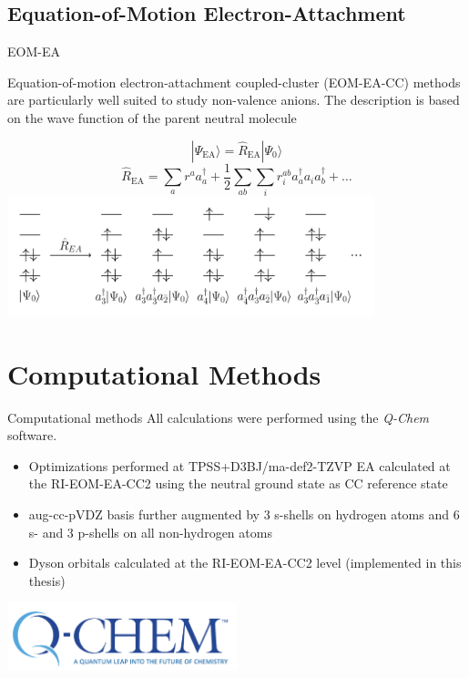 \documentclass[9pt,t,xcolor=table]{beamer}
\begin{document}
\subsection{Equation-of-Motion Electron-Attachment}
\begin{frame}{\huge EOM-EA}\large
	\begin{flushleft}
    Equation-of-motion electron-attachment coupled-cluster (EOM-EA-CC) methods are particularly well suited to study non-valence anions.
	The description is based on the wave function of the parent neutral molecule
	\end{flushleft}
	\centering
	\vspace{-2pt}
	    \[ |\Psi_{\mathrm{EA}} \rangle = \hat{R}_{\mathrm{EA}} | \Psi_0 \rangle \]
	\vspace{1pt}
		\[ \hat{R}_{\mathrm{EA}} = \sum_{a} r^a a_a^\dagger + \frac{1}{2} \sum_{ab} \sum_{i} r_{i}^{ab} a_a^\dagger a_i a_b^\dagger + \dots \]
	\includegraphics[width=0.8\textwidth]{Figs/EOM_EA.pdf}
	\vspace{3pt}
\end{frame}

\section{Computational Methods}
\begin{frame}{\huge Computational methods}\large
	All calculations were performed using the \textit{Q-Chem} software.
	\begin{itemize}
		\item Optimizations performed at TPSS+D3BJ/ma-def2-TZVP
		EA calculated at the RI-EOM-EA-CC2 using the neutral ground state as CC reference state
		\item aug-cc-pVDZ basis further augmented by 3 s-shells on hydrogen atoms and 6 s- and 3 p-shells on all non-hydrogen atoms
		\item Dyson orbitals calculated at the RI-EOM-EA-CC2 level (implemented in this thesis)
	\end{itemize}
	\vfill
	\centering
	\includegraphics[width=0.5\textwidth]{Figs/QCLogo.png}
	\vfill
\end{frame}
\end{document}
